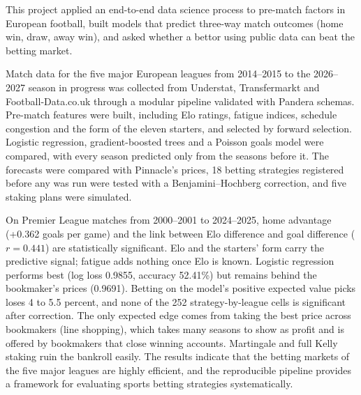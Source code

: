 
This project applied an end-to-end data science process to pre-match factors in European football, built models that predict three-way match outcomes (home win, draw, away win), and asked whether a bettor using public data can beat the betting market.

Match data for the five major European leagues from 2014--2015 to the 2026--2027 season in progress was collected from Understat, Transfermarkt and Football-Data.co.uk through a modular pipeline validated with Pandera schemas. Pre-match features were built, including Elo ratings, fatigue indices, schedule congestion and the form of the eleven starters, and selected by forward selection. Logistic regression, gradient-boosted trees and a Poisson goals model were compared, with every season predicted only from the seasons before it. The forecasts were compared with Pinnacle's prices, 18 betting strategies registered before any was run were tested with a Benjamini--Hochberg correction, and five staking plans were simulated.

On Premier League matches from 2000--2001 to 2024--2025, home advantage (+0.362 goals per game) and the link between Elo difference and goal difference ($r = 0.441$) are statistically significant. Elo and the starters' form carry the predictive signal; fatigue adds nothing once Elo is known. Logistic regression performs best (log loss 0.9855, accuracy 52.41\%) but remains behind the bookmaker's prices (0.9691). Betting on the model's positive expected value picks loses 4 to 5.5 percent, and none of the 252 strategy-by-league cells is significant after correction. The only expected edge comes from taking the best price across bookmakers (line shopping), which takes many seasons to show as profit and is offered by bookmakers that close winning accounts. Martingale and full Kelly staking ruin the bankroll easily. The results indicate that the betting markets of the five major leagues are highly efficient, and the reproducible pipeline provides a framework for evaluating sports betting strategies systematically.
